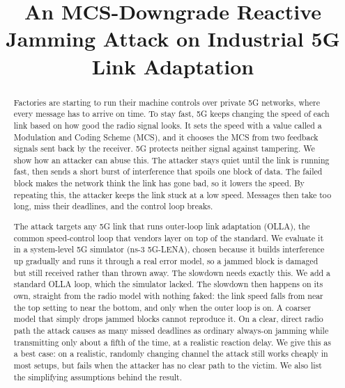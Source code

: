 \documentclass[conference]{IEEEtran}
\begin{document}
\title{An MCS-Downgrade Reactive Jamming Attack on Industrial 5G Link Adaptation}

\author{
}

\maketitle

\begin{abstract}
Factories are starting to run their machine controls over private 5G networks, where
every message has to arrive on time. To stay fast, 5G keeps changing the speed of each
link based on how good the radio signal looks. It sets the speed with a value called a
Modulation and Coding Scheme (MCS), and it chooses the MCS from two feedback signals
sent back by the receiver. 5G protects neither signal against tampering. We show how an
attacker can abuse this. The attacker stays quiet until the link is running fast, then
sends a short burst of interference that spoils one block of data. The failed block
makes the network think the link has gone bad, so it lowers the speed. By repeating
this, the attacker keeps the link stuck at a low speed. Messages then take too long,
miss their deadlines, and the control loop breaks.

The attack targets any 5G link that runs outer-loop link adaptation (OLLA), the common
speed-control loop that vendors layer on top of the standard. We evaluate it in a
system-level 5G simulator (ns-3 5G-LENA), chosen because it builds interference up
gradually and runs it through a real error model, so a jammed block is damaged but still
received rather than thrown away. The slowdown needs exactly this. We add a standard OLLA
loop, which the simulator lacked. The slowdown then happens on its own, straight from the
radio model with nothing faked: the link speed falls from near the top setting to near the
bottom, and only when the outer loop is on. A coarser model that simply drops jammed
blocks cannot reproduce it. On a clear, direct radio path the attack
causes as many missed deadlines as ordinary always-on jamming while transmitting only
about a fifth of the time, at a realistic reaction delay. We give this as a best case: on a
realistic, randomly changing channel the attack still works cheaply in most setups, but
fails when the attacker has no clear path to the victim. We also list the simplifying
assumptions behind the result.
\end{abstract}
\end{document}
